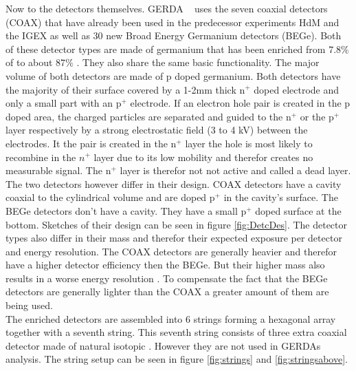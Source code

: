 \documentclass[encoding=utf8,british]{tumphthesis}
\begin{document}
Now to the detectors themselves.
GERDA \PII~ uses the seven coaxial detectors (COAX) that have already been used in the predecessor experiments HdM and the IGEX as well as 30 new Broad Energy Germanium detectors (BEGe).
Both of these detector types are made of germanium that has been enriched from 7.8$\%$ of  to about 87$\%$ \cite{agostini_background_2017}.
They also share the same basic functionality.
The major volume of both detectors are made of p doped germanium.
Both detectors have the majority of their surface covered by a 1-2mm thick n$^+$ doped electrode and only a small part with an p$^+$ electrode.
If an electron hole pair is created in the p doped area, the charged particles are separated and guided to the n$^+$ or the p$^+$ layer respectively by a strong electrostatic field (3 to 4 kV) between the electrodes.
It the pair is created in the n$^+$ layer the hole is most likely to recombine in the $n^+$ layer due to its low mobility and therefor creates no measurable signal.
The n$^+$ layer is therefor not not active and called a dead layer.
\\

The two detectors however differ in their design.
COAX detectors have a cavity coaxial to the cylindrical volume and are doped p$^+$ in the cavity's surface.
The BEGe detectors don't have a cavity.
They have a small p$^+$ doped surface at the bottom.
Sketches of their design can be seen in figure \ref{fig:DetcDes}.
The detector types also differ in their mass and therefor their expected exposure per detector and energy resolution.
The COAX detectors are generally heavier and therefor have a higher detector efficiency then the BEGe.
But their higher mass also results in a worse energy resolution \cite{agostini_production_2015}.
To compensate the fact that the BEGe detectors are generally lighter than the COAX a greater amount of them are being used.
\\


The enriched detectors are assembled into 6 strings forming a hexagonal array together with a seventh string.
This seventh string consists of three extra coaxial detector made of natural isotopic .
However they are not used in GERDAs analysis.
The string setup can be seen in figure \ref{fig:strings} and \ref{fig:stringsabove}.
\\
\end{document}
